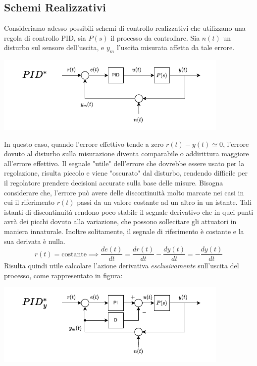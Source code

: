\documentclass[10pt, letterpaper]{report}
\begin{document}
\subsection{Schemi Realizzativi}
Consideriamo adesso possibili schemi di controllo realizzativi che utilizzano una regola di controllo PID, sia $P(s)$ il processo da controllare. Sia $n(t)$ un disturbo sul sensore dell'uscita, e $y_m$ l'uscita misurata affetta da tale errore.
\begin{center}
    \includegraphics[width=0.85\textwidth]{images/schemaDiControlloPID.pdf}
\end{center}
In questo caso, quando l'errore effettivo tende a zero $r(t)-y(t)\simeq 0$, l'errore dovuto al disturbo sulla misurazione diventa comparabile o addirittura maggiore all'errore effettivo.\acc  
Il segnale "utile" dell'errore che dovrebbe essere usato per la regolazione, risulta piccolo e viene "oscurato" dal disturbo, rendendo difficile per il regolatore prendere decisioni accurate sulla base delle misure.\acc 
Bisogna considerare che, l'errore può avere delle discontinuità molto marcate nei casi in cui il riferimento $r(t)$ passi da un valore costante ad un altro in un istante. Tali istanti di discontinuità rendono poco stabile il segnale derivativo che in quei punti avrà dei picchi dovuto alla variazione, che possono sollecitare gli attuatori in maniera innaturale. Inoltre solitamente, il segnale di riferimento è costante e la sua derivata è nulla. 
$$ 
r(t)=\text{costante}\implies
\frac{de(t)}{dt}=\frac{dr(t)}{dt}-\frac{dy(t)}{dt}=-\frac{dy(t)}{dt}
$$ 
Risulta quindi utile calcolare l'azione derivativa \textit{esclusivamente} sull'uscita del processo, come rappresentato in figura:
\begin{center}
    \includegraphics[width=0.85\textwidth]{images/schemaPIDderivataUscita.pdf}
\end{center}
\end{document}
